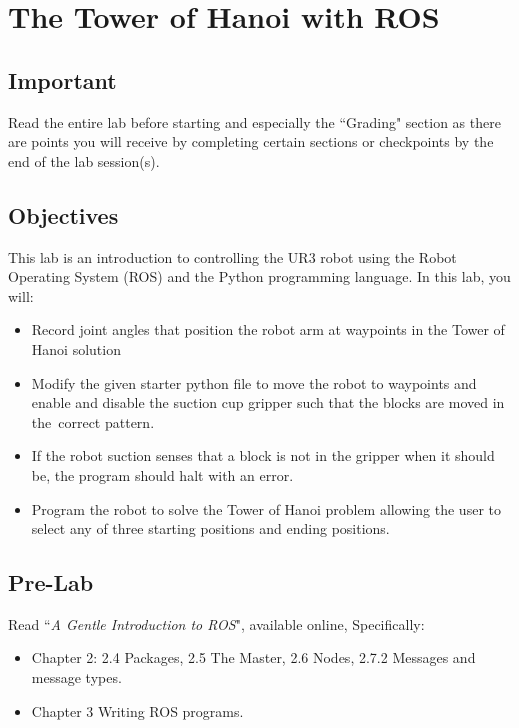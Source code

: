 \chapter{The Tower of Hanoi with ROS}
\section{Important}
Read the entire lab before starting and especially the ``Grading" section as there are points you will receive by completing certain sections or checkpoints
by the end of the lab session(s). 
\section{Objectives}
This lab is an introduction to controlling the UR3 robot using the Robot Operating System (ROS) and the Python programming language.  In this lab, you will:
\begin{itemize}
\item Record joint angles that position the robot arm at waypoints in the Tower of Hanoi solution
\item Modify the given starter python file to move the robot to waypoints and enable and disable the suction cup gripper such that the blocks are moved in the\
correct pattern.
\item If the robot suction senses that a block is not in the gripper when it should be, the program should halt with an error.
\item Program the robot to solve the Tower of Hanoi problem allowing the user to select any of three starting positions and ending positions.
\end{itemize}

\newpage
\section{Pre-Lab}
Read ``\textit{A Gentle Introduction to ROS}", available online, Specifically:
\begin{itemize}
\item Chapter 2: 2.4 Packages, 2.5 The Master, 2.6 Nodes, 2.7.2 Messages and message types.
\item Chapter 3 Writing ROS programs.
\end{itemize}
